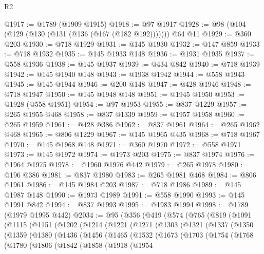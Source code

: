\begin{lexlean}{R2}
\begin{coremodule}
@1917 := @1789 (@1909 @1915)
@1918 := @97 @1917
@1928 := @98 (@104 (@129 (@130 (@131 (@136 (@167 (@182 @192))))))) @64 @11
@1929 := @360 @203
@1930 := @718 @1929
@1931 := @145 @1930
@1932 := @147 @859
@1933 := @718 @1932
@1935 := @145 @1933 @148
@1936 := @1931 @1935
@1937 := @558 @1936
@1938 := @145 @1937
@1939 := @434 @842
@1940 := @718 @1939
@1942 := @145 @1940 @148
@1943 := @1938 @1942
@1944 := @558 @1943
@1945 := @145 @1944
@1946 := @200 @148
@1947 := @428 @1946
@1948 := @718 @1947
@1950 := @145 @1948 @148
@1951 := @1945 @1950
@1953 := @1928 (@558 @1951)
@1954 := @97 @1953
@1955 := @837 @1229
@1957 := @265 @1955 @468
@1958 := @837 @1339
@1959 := @1957 @1958
@1960 := @265 @1959
@1961 := @428 @386
@1962 := @837 @1961
@1964 := @265 @1962 @468
@1965 := @806 @1229
@1967 := @145 @1965 @435
@1968 := @718 @1967
@1970 := @145 @1968 @148
@1971 := @360 @1970
@1972 := @558 @1971
@1973 := @145 @1972
@1974 := @1973 @203
@1975 := @837 @1974
@1976 := @1964 @1975
@1978 := @1960 @1976 @442
@1979 := @265 @1978
@1980 := @196 @386
@1981 := @837 @1980
@1983 := @265 @1981 @468
@1984 := @806 @1961
@1986 := @145 @1984 @203
@1987 := @718 @1986
@1989 := @145 @1987 @148
@1990 := @1973 @1989
@1991 := @558 @1990
@1993 := @145 @1991 @842
@1994 := @837 @1993
@1995 := @1983 @1994
@1998 := @1789 (@1979 @1995 @442)
@2034 := @95
    (@356
      (@419
        (@574
          (@765
            (@819
              (@1091
                (@1115
                  (@1151
                    (@1202
                      (@1214
                        (@1221
                          (@1271
                            (@1303
                              (@1321
                                (@1337
                                  (@1350
                                    (@1359
                                      (@1380
                                        (@1436
                                          (@1456
                                            (@1465
                                              (@1532
                                                (@1673
                                                  (@1703
                                                    (@1754
                                                      (@1768
                                                        (@1780
                                                          (@1806
                                                            (@1842
                                                              (@1858
                                                                (@1918
                                                                  (@1954

\end{coremodule}
\end{lexlean}
